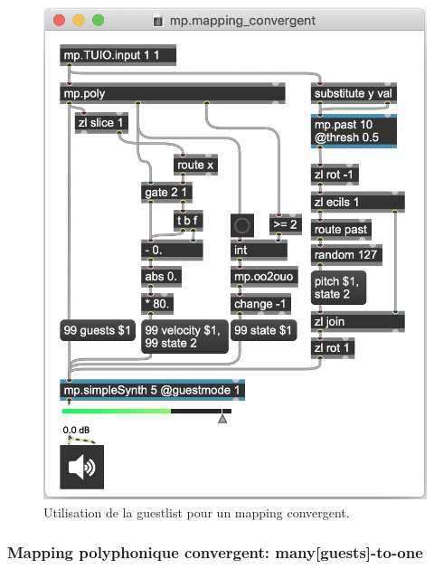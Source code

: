 \begin{figure}[!htbp]
\begin{minipage}[t]{0.58\textwidth}
	  	\includegraphics[width=\linewidth]{gfx/04_algorithms/MP-mappingConvergent.png}
		\caption[Exemple de patch MP : guestlist]{Utilisation de la guestlist pour un mapping convergent.}
		\label{fig:algorithms:MP-convergent}
	\end{minipage}
\end{figure}


\subsubsection*{Mapping polyphonique convergent: many[guests]-to-one}
\label{sec:algorithms:many-guests-to-one}

